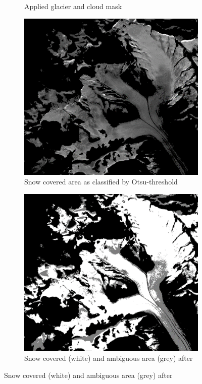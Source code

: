 \documentclass[12pt]{article}
\begin{document}
\begin{figure}[h]
\begin{subfigure}[height=3cm]{0.475\textwidth}
            \caption{\small Applied glacier and cloud mask}   
            \label{fig:aletsch_masks}
        \end{subfigure}
        \begin{subfigure}[height=3cm]{0.475\textwidth}   
            \centering 
            \includegraphics[width=\textwidth]{altesch_otsu}
            \caption{ Snow covered area as classified by Otsu-threshold}   
            \label{fig:aletsch_otsu}
        \end{subfigure}
        \hspace{0.5cm}
        \begin{subfigure}[height=3cm]{0.475\textwidth}   
           \centering 
            \includegraphics[width=\textwidth]{altesch_naegeli}
            \caption{\small Snow covered (white) and ambiguous area (grey) after \cite{Naegeli2018}}  
           \label{fig:aletsch_naegeli}
       \end{subfigure}
        

\end{figure}
\end{document}
